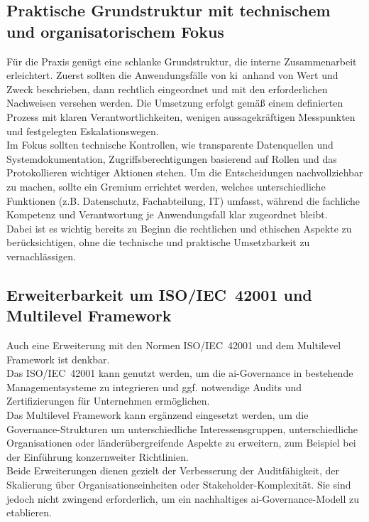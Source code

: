 \subsection{Praktische Grundstruktur mit technischem und organisatorischem Fokus}
Für die Praxis genügt eine schlanke Grundstruktur, die interne Zusammenarbeit erleichtert.
Zuerst sollten die Anwendungsfälle von \ac{ki}\ anhand von Wert und Zweck beschrieben, dann rechtlich eingeordnet und mit den erforderlichen Nachweisen versehen werden.
Die Umsetzung erfolgt gemäß einem definierten Prozess mit klaren Verantwortlichkeiten, wenigen aussagekräftigen Messpunkten und festgelegten Eskalationswegen.
\\
Im Fokus sollten technische Kontrollen, wie transparente Datenquellen und Systemdokumentation, Zugriffsberechtigungen basierend auf Rollen und das Protokollieren wichtiger Aktionen stehen.
Um die Entscheidungen nachvollziehbar zu machen, sollte ein Gremium errichtet werden, welches unterschiedliche Funktionen (z.B. Datenschutz, Fachabteilung, IT) umfasst, während die fachliche Kompetenz und Verantwortung je Anwendungsfall klar zugeordnet bleibt.
\\
Dabei ist es wichtig bereits zu Beginn die rechtlichen und ethischen Aspekte zu berücksichtigen, ohne die technische und praktische Umsetzbarkeit zu vernachlässigen.

\subsection{Erweiterbarkeit um ISO/IEC~42001 und Multilevel Framework}
Auch eine Erweiterung mit den Normen ISO/IEC~42001 und dem Multilevel Framework ist denkbar.
\\
Das ISO/IEC~42001 kann genutzt werden, um die \ac{ai}-Governance in bestehende Managementsysteme zu integrieren und ggf. notwendige Audits und Zertifizierungen für Unternehmen ermöglichen.
\\
Das Multilevel Framework kann ergänzend eingesetzt werden, um die Governance-Strukturen um unterschiedliche Interessensgruppen, unterschiedliche Organisationen oder länderübergreifende Aspekte zu erweitern, zum Beispiel bei der Einführung konzernweiter Richtlinien.
\\
Beide Erweiterungen dienen gezielt der Verbesserung der Auditfähigkeit, der Skalierung über Organisationseinheiten oder Stakeholder-Komplexität.
Sie sind jedoch nicht zwingend erforderlich, um ein nachhaltiges \ac{ai}-Governance-Modell zu etablieren.

